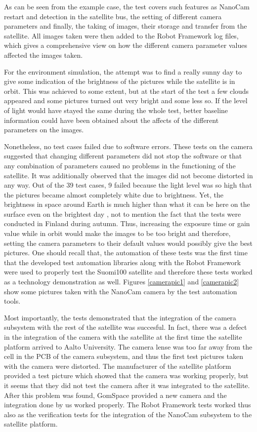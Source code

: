 \documentclass[english,12pt,a4paper,pdftex,elec,utf8]{aaltothesis}
\begin{document}
As can be seen from the example case, the test covers such features as NanoCam restart and detection in the satellite bus, the setting of different camera parameters and finally, the taking of images, their storage and transfer from the satellite. All images taken were then added to the Robot Framework log files, which gives a comprehensive view on how the different camera parameter values affected the images taken.\par 
For the environment simulation, the attempt was to find a really sunny day to give some indication of the brightness of the pictures while the satellite is in orbit. This was achieved to some extent, but at the start of the test a few clouds appeared and some pictures turned out very bright and some less so. If the level of light would have stayed the same during the whole test, better baseline information could have been obtained about the affects of the different parameters on the images.\par
Nonetheless, no test cases failed due to software errors. These tests on the camera suggested that changing different parameters did not stop the software or that any combination of parameters caused no problems in the functioning of the satellite. It was additionally observed that the images did not become distorted in any way. Out of the 39 test cases, 9 failed because the light level was so high that the pictures became almost completely white due to brightness. Yet, the brightness in space around Earth is much higher than what it can be here on the surface even on the brightest day \cite{solarradiation}, not to mention the fact that the tests were conducted in Finland during autumn. Thus, increasing the exposure time or gain value while in orbit would make the images to be too bright and therefore, setting the camera parameters to their default values would possibly give the best pictures. One should recall that, the automation of these tests was the first time that the developed test automation libraries along with the Robot Framework were used to properly test the Suomi100 satellite and therefore these tests worked as a technology demonstration as well. Figures \ref{camerapic1} and \ref{camerapic2} show some pictures taken with the NanoCam camera by the test automation tools. \par
Most importantly, the tests demonstrated that the integration of the camera subsystem with the rest of the satellite was succesful. In fact, there was a defect in the integration of the camera with the satellite at the first time the satellite platform arrived to Aalto University. The camera lense was too far away from the cell in the PCB of the camera subsystem, and thus the first test pictures taken with the camera were distorted. The manufacturer of the satellite platform provided a test picture which showed that the camera was working properly, but it seems that they did not test the camera after it was integrated to the satellite. After this problem was found, GomSpace provided a new camera and the integration done by us worked properly. The Robot Framework tests worked thus also as the verification tests for the integration of the NanoCam subsystem to the satellite platform.\par 
\end{document}
